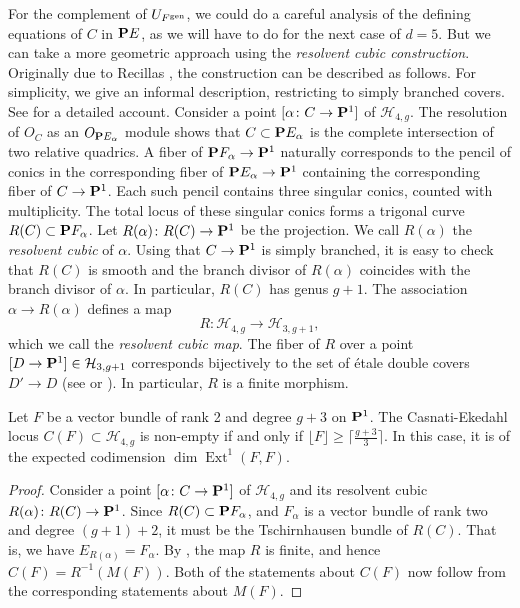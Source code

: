 \documentclass{article}
\renewcommand {\P}{{\bf P}}
\providecommand {\from}{{\colon}}
\providecommand{\Ext}{\operatorname{Ext}}
\renewcommand{\H}{\mathcal H}
\newcommand{\gen}{{\rm gen}}
\numberwithin{equation}{section}
\begin{document}
For the complement of $U_{F^\gen}$, we could do a careful analysis of the
defining equations of $C$ in $\P E$, as we will have to do for the
next case of $d = 5$. But we can take a more geometric approach using
the \emph{resolvent cubic construction}. Originally due to Recillas
\cite{recillas:73}, the construction can be described as
follows. For simplicity, we give an informal description, restricting
to simply branched covers. See \cite{casnati:trigconst} for a detailed
account. Consider a point $[\alpha \from C \to \P^1]$ of
$\H_{4,g}$. The resolution of $O_C$ as an $O_{\P E_\alpha}$ module
shows that $C \subset \P E_\alpha$ is the complete intersection of two
relative quadrics. A fiber of $\P F_\alpha \to \P^1$ naturally
corresponds to the pencil of conics in the corresponding fiber of $\P
E_\alpha \to \P^1$ containing the corresponding fiber of $C \to
\P^1$. Each such pencil contains three singular conics, counted with
multiplicity. The total locus of these singular conics forms a
trigonal curve $R(C) \subset \P F_\alpha$. Let $R(\alpha) \from R(C)
\to \P^1$ be the projection. We call $R(\alpha)$ the \emph{resolvent
  cubic} of $\alpha$. Using that $C \to \P^1$ is simply branched, it
is easy to check that $R(C)$ is smooth and the branch divisor of
$R(\alpha)$ coincides with the branch divisor of $\alpha$. In
particular, $R(C)$ has genus $g+1$. The association $\alpha \to
R(\alpha)$ defines a map
\[ R \from \H_{4,g} \to \H_{3,g+1},\] which we call the
\emph{resolvent cubic map}. The fiber of $R$ over a point $[D \to
\P^1] \in \H_{3,g+1}$ corresponds bijectively to the set of \'etale
double covers $D' \to D$ (see \cite{recillas:73} or
\cite[Theorem~6.5]{casnati:trigconst}). In particular, $R$ is a finite
morphism.

\begin{proposition}\label{thm:4_C(F)}
  Let $F$ be a vector bundle of rank 2 and degree $g+3$ on $\P^1$. The
  Casnati-Ekedahl locus $C(F) \subset \H_{4,g}$ is
  non-empty if and only if $\lfloor F \rfloor \geq \lceil
  \frac{g+3}{3} \rceil$. In this case, it is of the expected
  codimension $\dim \Ext^1(F,F)$.
\end{proposition}
\begin{proof}
  Consider a point $[\alpha \from C \to \P^1]$ of $\H_{4,g}$ and
  its resolvent cubic $R(\alpha) \from R(C) \to \P^1$. Since $R(C)
  \subset \P F_\alpha$, and $F_\alpha$ is a vector bundle of rank two
  and degree $(g+1)+2$, it must be the Tschirnhausen bundle of
  $R(C)$. That is, we have $E_{R(\alpha)} = F_\alpha$. By
  \cite{recillas:73}, the map $R$ is finite, and hence
  ${C}(F) = R^{-1}({M}(F)).$ Both of the statements about
  ${C}(F)$ now follow from the corresponding statements about $M(F)$.
\end{proof}
\end{document}
